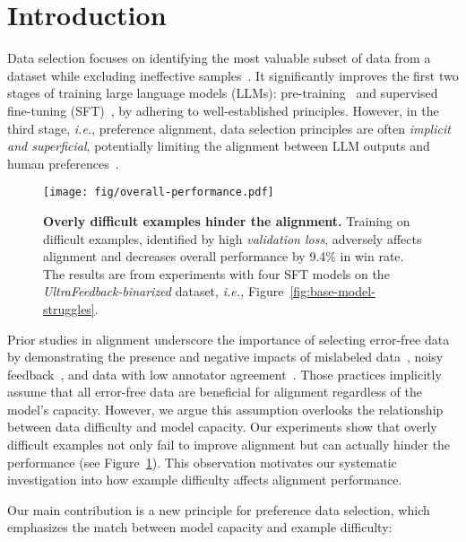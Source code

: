 \section{Introduction}
Data selection focuses on identifying the most valuable subset of data from a dataset while excluding ineffective samples~\cite{albalak2024survey}. It significantly improves the first two stages of training large language models (LLMs): pre-training~\cite{lee2021deduplicating,penedo2023refinedweb,txt360data2024} and supervised fine-tuning (SFT)~\cite{cao2023instruction,qin2024unleashing,zhou2024lima}, by adhering to well-established principles. However, in the third stage, \textit{i.e.}, preference alignment, data selection principles are often \textit{implicit and superficial}, potentially limiting the alignment between LLM outputs and human preferences~\cite{askell2021general,weidinger2021ethical}.

\begin{figure}
    \centering
    \texttt{[image: fig/overall-performance.pdf]}
    \vspace{-0.8cm}
    \caption{\textbf{Overly difficult examples hinder the alignment.} Training on difficult examples, identified by high \textit{validation loss}, adversely affects alignment and decreases overall performance by 9.4\% in win rate. The results are from experiments with four SFT models on the \textit{UltraFeedback-binarized} dataset, \textit{i.e.,} Figure~\ref{fig:base-model-struggles}.
    }
    \vspace{-0.4cm}
    \label{fig:overall-performance}
\end{figure}

Prior studies in alignment underscore the importance of selecting error-free data by demonstrating the presence and negative impacts of mislabeled data~\cite{wang2024secrets,gao2024impact}, noisy feedback~\cite{mitchell2023note,chowdhury2024provably}, and data with low annotator agreement~\cite{ultrafeedback_preferences}. Those practices implicitly assume that all error-free data are beneficial for alignment regardless of the model's capacity. However, we argue this assumption overlooks the relationship between data difficulty and model capacity. 
Our experiments show that overly difficult examples not only fail to improve alignment but can actually hinder the performance (see Figure~\ref{fig:overall-performance}).
This observation motivates our systematic investigation into how example difficulty affects alignment performance.

Our main contribution is a new principle for preference data selection, which emphasizes the match between model capacity and example difficulty: 


